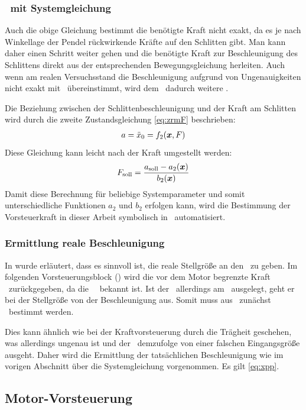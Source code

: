 \subsubsection{\vorst\  mit Systemgleichung}
Auch die obige Gleichung bestimmt die benötigte Kraft nicht exakt, da es je nach Winkellage der Pendel rückwirkende Kräfte auf den Schlitten gibt.
Man kann daher einen Schritt weiter gehen und die benötigte Kraft zur Beschleunigung des Schlittens direkt aus der entsprechenden Bewegungsgleichung herleiten. 
Auch wenn am realen Versuchsstand die Beschleunigung aufgrund von Ungenauigkeiten nicht exakt mit \asoll\ übereinstimmt, wird dem \avr\ dadurch weitere .

Die Beziehung zwischen der Schlittenbeschleunigung und der Kraft am Schlitten wird durch die zweite Zustandsgleichung \eqref{eq:zrmF} beschrieben:
\begin{align}
	a=\ddot{x}_0=f_2(\boldsymbol{x},F)
	\label{eq:xpp}
\end{align}
Diese Gleichung kann leicht nach der Kraft umgestellt werden:
\begin{align}
	F_{\mathrm{soll}}=\frac{a_{\mathrm{soll}}-a_2(\boldsymbol{x})}{b_2(\boldsymbol{x})}
\end{align}
Damit diese Berechnung für beliebige Systemparameter und somit unterschiedliche Funktionen $a_2$ und $b_2$ erfolgen kann, wird die Bestimmung der Vorsteuerkraft in dieser Arbeit symbolisch in \ml\ automatisiert.

\subsubsection{Ermittlung reale Beschleunigung}
In  wurde erläutert, dass es sinnvoll ist, die reale Stellgröße an den \beob\ zu geben.
Im folgenden Vorsteuerungsblock () wird die vor dem Motor begrenzte Kraft \freal\ zurückgegeben, da die \sgb\ \fmax\ bekannt ist.
Ist der \beob\ allerdings am \bss\ ausgelegt, geht er bei der Stellgröße von der Beschleunigung aus.
Somit muss aus \freal\ zunächst \areal\ bestimmt werden.

Dies kann ähnlich wie bei der Kraftvorsteuerung durch die Trägheit geschehen, was allerdings ungenau ist und der \beob\ demzufolge von einer falschen Eingangsgröße ausgeht.
Daher wird die Ermittlung der tatsächlichen Beschleunigung wie im vorigen Abschnitt über die Systemgleichung vorgenommen.
Es gilt \eqref{eq:xpp}.



\subsection{Motor-Vorsteuerung}\label{sec:motvorst}

